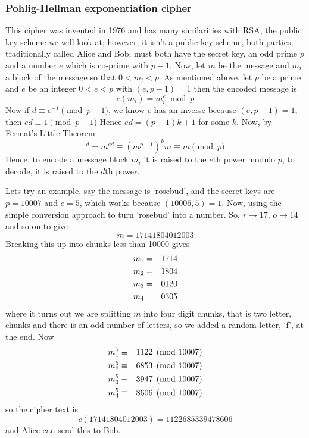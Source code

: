 \documentclass[12pt]{article}
\begin{document}
\subsubsection*{Pohlig-Hellman exponentiation cipher}

This cipher was invented in 1976 and has many similarities with RSA, the public key scheme we will look at; however, it isn't a public key scheme, both parties, traditionally called Alice and Bob, must both have the secret key, an odd prime $p$ and a number $e$ which is co-prime with $p-1$. Now, let $m$ be the message and $m_i$ a block of the message so that $0< m_i< p$. As mentioned above, let $p$ be a prime and $e$ be an integer $0<e<p$ with $(e,p-1)=1$ then the encoded message is 
\begin{equation}
c(m_i)=m_i^e \bmod{p}
\end{equation}
Now if $d\equiv e^{-1}\pmod{p-1}$, we know $e$ has an inverse because $(e,p-1)=1$, then $ed\equiv 1\pmod{p-1}$ Hence $ed=(p-1)k+1$ for some $k$. Now, by Fermat's Little Theorem
\begin{equation}
[c(m)]^d=m^{ed}\equiv (m^{p-1})^km\equiv m\pmod p
\end{equation}
Hence, to encode a message block $m_i$ it is raised to the $e$th power modulo $p$, to decode, it is raised to the $d$th power.

Lets try an example, say the message is \lq{}rosebud\rq{}, and the
secret keys are $p=10007$ and $e=5$, which works because
$(10006,5)=1$. Now, using the simple conversion approach to turn
\lq{}rosebud\rq{} into a number. So, $r\rightarrow 17$, $o\rightarrow 14$ and so on to give
\begin{equation}
m=17141804012003
\end{equation}
Breaking this up into chunks less than 10000 gives
\begin{eqnarray}
m_1&=&1714\cr
m_2&=&1804\cr
m_3&=&0120\cr
m_4&=&0305
\end{eqnarray}
where it turns out we are splitting $m$ into four digit chunks, that is two letter, chunks and there is an odd number of letters, so we added a random letter, \lq{}f\rq{}, at the end. Now
\begin{eqnarray}
m_1^5&\equiv&1122\pmod{10007}\cr
m_2^5&\equiv&6853\pmod{10007}\cr
m_3^5&\equiv&3947\pmod{10007}\cr
m_4^5&\equiv&8606\pmod{10007}
\end{eqnarray}
so the cipher text is
\begin{equation}
c(17141804012003)=1122685339478606
\end{equation}
and Alice can send this to Bob. 
\end{document}
